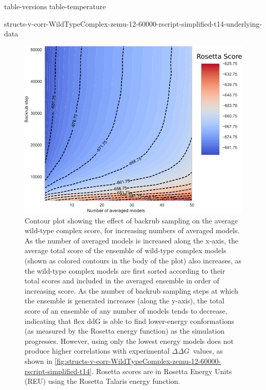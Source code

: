 \documentclass[journal=jpcbfk,manuscript=suppinfo]{achemso}
\newcommand\ddg{$\Delta\Delta G$}
\begin{document}
\renewcommand{\thefigure}{S\arabic{figure}}
\setcounter{figure}{0}
\renewcommand{\thetable}{S\arabic{table}}
\setcounter{table}{0}
\renewcommand*{\thepage}{S\arabic{page}}

{table-versions}
{table-temperature}
\clearpage

\clearpage

  {\small
    {structs-v-corr-WildTypeComplex-zemu-12-60000-rscript-simplified-t14-underlying-data}
  }
\clearpage

\begin{figure}
  \centering
  \includegraphics[width=\textwidth,keepaspectratio]{figures/wildtypecomplex-scores-complete.png}
  \caption{
    Contour plot showing the effect of backrub sampling on the average wild-type complex score, for increasing numbers of averaged models. As the number of averaged models is increased along the x-axis, the average total score of the ensemble of wild-type complex models (shown as colored contours in the body of the plot) also increases, as the wild-type complex models are first sorted according to their total scores and included in the averaged ensemble in order of increasing score.
    As the number of backrub sampling steps at which the ensemble is generated increases (along the y-axis), the total score of an ensemble of any number of models tends to decrease, indicating that flex ddG is able to find lower-energy conformations (as measured by the Rosetta energy function) as the simulation progresses. However, using only the lowest energy models does not produce higher correlations with experimental \ddg\ values, as shown in \cref{fig:structs-v-corr-WildTypeComplex-zemu-12-60000-rscript-simplified-t14}.
    Rosetta scores are in Rosetta Energy Units (REU) using the Rosetta Talaris energy function\cite{song_structure-guided_2011,shapovalov_smoothed_2011,omeara_combined_2015}.
  } \label{fig:wildtypecomplex-scores-complete}
\end{figure}
\end{document}
